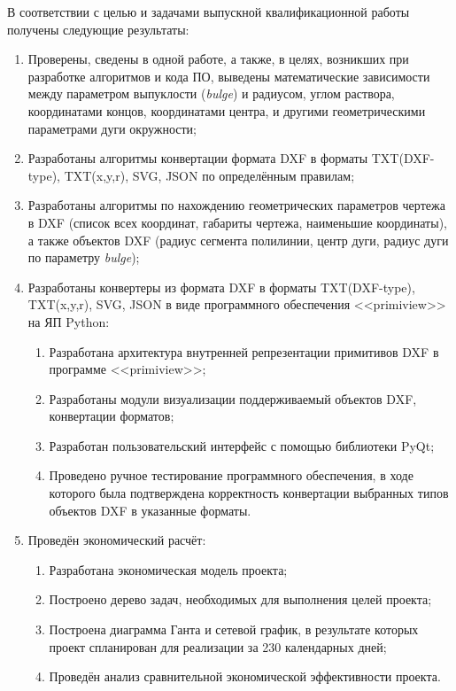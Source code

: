\Conclusion %

В соответствии с целью и задачами выпускной квалификационной работы получены следующие результаты:

\begin{enumerate}[1)]
	\item Проверены, сведены в одной работе, а также, в целях, возникших при разработке алгоритмов и кода ПО, выведены  математические зависимости между параметром выпуклости (\textit{bulge}) и радиусом, углом раствора, координатами концов, координатами центра, и другими геометрическими параметрами дуги окружности;
	\item Разработаны алгоритмы конвертации формата DXF в форматы TXT(DXF-type), TXT(x,y,r), SVG, JSON по определённым правилам;
	\item Разработаны алгоритмы по нахождению геометрических параметров чертежа в DXF (список всех координат, габариты чертежа, наименьшие координаты), а также объектов DXF (радиус сегмента полилинии, центр дуги, радиус дуги по параметру \textit{bulge});
	\item Разработаны конвертеры из формата DXF в форматы TXT(DXF-type), TXT(x,y,r), SVG, JSON в виде программного обеспечения <<primiview>> на ЯП Python:
	\begin{enumerate}[4.1)]
		\item Разработана архитектура внутренней репрезентации примитивов DXF в программе <<primiview>>;
		\item Разработаны модули визуализации поддерживаемый объектов DXF, конвертации форматов;
		\item Разработан пользовательский интерфейс с помощью библиотеки PyQt;
		\item Проведено ручное тестирование программного обеспечения, в ходе которого была подтверждена корректность конвертации выбранных типов объектов DXF в указанные форматы.
	\end{enumerate}
	\item Проведён экономический расчёт:
	\begin{enumerate}[5.1)]
		\item Разработана экономическая модель проекта;
		\item Построено дерево задач, необходимых для выполнения целей проекта;
		\item Построена диаграмма Ганта и сетевой график,  в результате которых проект спланирован для реализации за 230 календарных дней;
		\item Проведён анализ сравнительной экономической эффективности проекта.
	\end{enumerate}
\end{enumerate}

